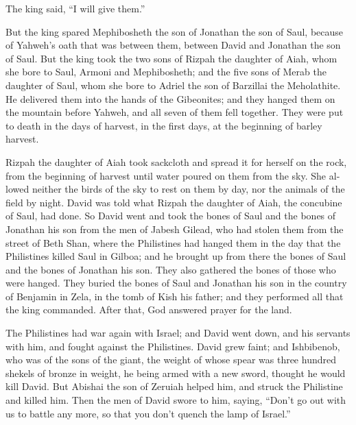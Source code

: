 \begin{paracol}{2}
\begin{otherlanguage}{english}
The king said, ``I will give them.''

 But the king spared Mephibosheth the son of Jonathan the
son of Saul, because of Yahweh's oath that was between them, between
David and Jonathan the son of Saul.  But the king took the
two sons of Rizpah the daughter of Aiah, whom she bore to Saul, Armoni
and Mephibosheth; and the five sons of Merab the daughter of Saul, whom
she bore to Adriel the son of Barzillai the Meholathite. 
He delivered them into the hands of the Gibeonites; and they hanged them
on the mountain before Yahweh, and all seven of them fell together. They
were put to death in the days of harvest, in the first days, at the
beginning of barley harvest.

 Rizpah the daughter of Aiah took sackcloth and spread it
for herself on the rock, from the beginning of harvest until water
poured on them from the sky. She allowed neither the birds of the sky to
rest on them by day, nor the animals of the field by night.
 David was told what Rizpah the daughter of Aiah, the
concubine of Saul, had done.  So David went and took the
bones of Saul and the bones of Jonathan his son from the men of Jabesh
Gilead, who had stolen them from the street of Beth Shan, where the
Philistines had hanged them in the day that the Philistines killed Saul
in Gilboa;  and he brought up from there the bones of
Saul and the bones of Jonathan his son. They also gathered the bones of
those who were hanged.  They buried the bones of Saul and
Jonathan his son in the country of Benjamin in Zela, in the tomb of Kish
his father; and they performed all that the king commanded. After that,
God answered prayer for the land.

 The Philistines had war again with Israel; and David
went down, and his servants with him, and fought against the
Philistines. David grew faint;  and Ishbibenob, who was
of the sons of the giant, the weight of whose spear was three hundred
shekels of bronze in weight, he being armed with a new sword, thought he
would kill David.  But Abishai the son of Zeruiah helped
him, and struck the Philistine and killed him. Then the men of David
swore to him, saying, ``Don't go out with us to battle any more, so that
you don't quench the lamp of Israel.''


\end{otherlanguage}
\end{paracol}
